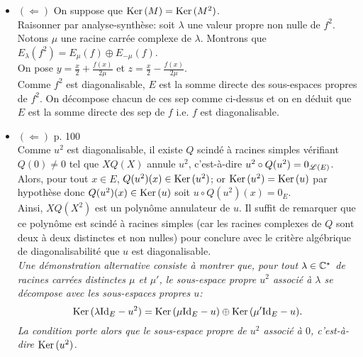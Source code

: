 \begin{preuve}
\begin{itemize}
        \item $(\Leftarrow)$ On suppose que $\mathrm{Ker}\,(M) = \mathrm{Ker}\,(M^2)$. \\
        Raisonner par analyse-synthèse: soit $\lambda$ une valeur propre non nulle de $f^2$. Notons $\mu$ une racine carrée complexe de $\lambda$. Montrons que $E_{\lambda}(f^2) = E_{\mu}(f) \oplus E_{-\mu}(f)$. \\
        On pose $y = \frac{x}{2} + \frac{f(x)}{2 \mu}$ et $z = \frac{x}{2} - \frac{f(x)}{2 \mu}$. \\
        Comme $f^2$ est diagonalisable, $E$ est la somme directe des sous-espaces propres de $f^2$. On décompose chacun de ces sep comme ci-dessus et on en déduit que $E$ est la somme directe des sep de $f$ i.e. $f$ est diagonalisable. 
        \item $(\Leftarrow)$ \cite{reduc_des_endo} p. 100 \\
        Comme $u^2$ est diagonalisable, il existe $Q$ scindé à racines simples vérifiant $Q(0) \not= 0$ tel que $X Q(X)$ annule $u^2$, c'est-à-dire $u^2 \circ Q(u^2) = 0_{\mathscr{L}(E)}$. \\
        Alors, pour tout $x \in E$, $Q(u^2)(x) \in \mathrm{Ker}\,(u^2)$; or $\mathrm{Ker}\,(u^2) = \mathrm{Ker}\,(u)$ par hypothèse donc $Q(u^2)(x) \in \mathrm{Ker}\,(u)$ soit $u \circ Q(u^2) (x) = 0_E$. \\
        Ainsi, $XQ(X^2)$ est un polynôme annulateur de $u$. Il suffit de remarquer que ce polynôme est scindé à racines simples (car les racines complexes de $Q$ sont deux à deux distinctes et non nulles) pour conclure avec le critère algébrique de diagonalisabilité que $u$ est diagonalisable. \\
        \textsl{Une démonstration alternative consiste à montrer que, pour tout $\lambda \in \mathbb{C}^\star$ de racines carrées distinctes $\mu$ et $\mu'$, le sous-espace propre $u^2$ associé à $\lambda$ se décompose avec les sous-espaces propres $u$:
        $$\mathrm{Ker}\,(\lambda \mathrm{Id}_E - u^2) = \mathrm{Ker}\,(\mu \mathrm{Id}_E - u) \oplus \mathrm{Ker}\,(\mu' \mathrm{Id}_E - u).$$
        La condition porte alors que le sous-espace propre de $u^2$ associé à $0$, c'est-à-dire $\mathrm{Ker}\,(u^2)$.
        }
    \end{itemize}
\end{preuve}
